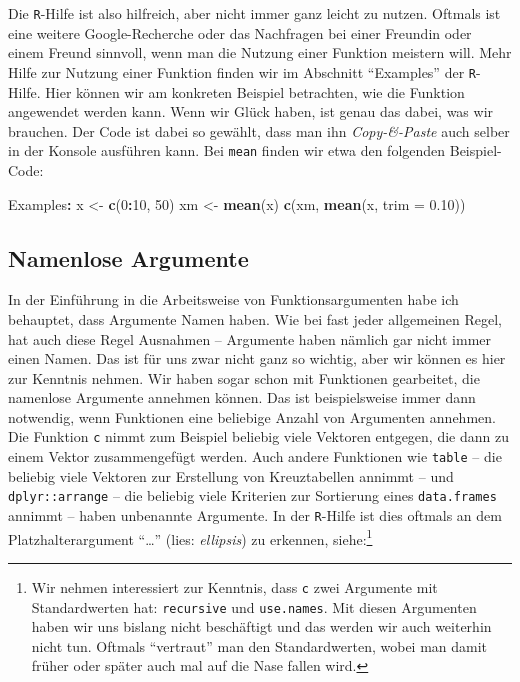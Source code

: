 \documentclass[12pt,]{tufte-book}
\newenvironment{Shaded}{\begin{snugshade}}{\end{snugshade}}
\newcommand{\KeywordTok}[1]{\textcolor[rgb]{0.13,0.29,0.53}{\textbf{#1}}}
\newcommand{\DataTypeTok}[1]{\textcolor[rgb]{0.13,0.29,0.53}{#1}}
\newcommand{\DecValTok}[1]{\textcolor[rgb]{0.00,0.00,0.81}{#1}}
\newcommand{\FloatTok}[1]{\textcolor[rgb]{0.00,0.00,0.81}{#1}}
\newcommand{\StringTok}[1]{\textcolor[rgb]{0.31,0.60,0.02}{#1}}
\newcommand{\OperatorTok}[1]{\textcolor[rgb]{0.81,0.36,0.00}{\textbf{#1}}}
\newcommand{\NormalTok}[1]{#1}
\theoremstyle{definition}
\theoremstyle{definition}
\theoremstyle{definition}
\theoremstyle{remark}
\begin{document}
Die \texttt{R}-Hilfe ist also hilfreich, aber nicht immer ganz leicht zu
nutzen. Oftmals ist eine weitere Google-Recherche oder das Nachfragen
bei einer Freundin oder einem Freund sinnvoll, wenn man die Nutzung
einer Funktion meistern will. Mehr Hilfe zur Nutzung einer Funktion
finden wir im Abschnitt ``Examples'' der \texttt{R}-Hilfe. Hier können
wir am konkreten Beispiel betrachten, wie die Funktion angewendet werden
kann. Wenn wir Glück haben, ist genau das dabei, was wir brauchen. Der
Code ist dabei so gewählt, dass man ihn \emph{Copy-\&-Paste} auch selber
in der Konsole ausführen kann. Bei \texttt{mean} finden wir etwa den
folgenden Beispiel-Code:

\begin{Shaded}
\begin{Highlighting}[]
\NormalTok{Examples}\OperatorTok{:}
\StringTok{     }\NormalTok{x <-}\StringTok{ }\KeywordTok{c}\NormalTok{(}\DecValTok{0}\OperatorTok{:}\DecValTok{10}\NormalTok{, }\DecValTok{50}\NormalTok{)}
\NormalTok{     xm <-}\StringTok{ }\KeywordTok{mean}\NormalTok{(x)}
     \KeywordTok{c}\NormalTok{(xm, }\KeywordTok{mean}\NormalTok{(x, }\DataTypeTok{trim =} \FloatTok{0.10}\NormalTok{))}
\end{Highlighting}
\end{Shaded}

\subsection{Namenlose Argumente}\label{namenlose-argumente}

In der Einführung in die Arbeitsweise von Funktionsargumenten habe ich
behauptet, dass Argumente Namen haben. Wie bei fast jeder allgemeinen
Regel, hat auch diese Regel Ausnahmen -- Argumente haben nämlich gar
nicht immer einen Namen. Das ist für uns zwar nicht ganz so wichtig,
aber wir können es hier zur Kenntnis nehmen. Wir haben sogar schon mit
Funktionen gearbeitet, die namenlose Argumente annehmen können. Das ist
beispielsweise immer dann notwendig, wenn Funktionen eine beliebige
Anzahl von Argumenten annehmen. Die Funktion \texttt{c} nimmt zum
Beispiel beliebig viele Vektoren entgegen, die dann zu einem Vektor
zusammengefügt werden. Auch andere Funktionen wie \texttt{table} -- die
beliebig viele Vektoren zur Erstellung von Kreuztabellen annimmt -- und
\texttt{dplyr::arrange} -- die beliebig viele Kriterien zur Sortierung
eines \texttt{data.frames} annimmt -- haben unbenannte Argumente. In der
\texttt{R}-Hilfe ist dies oftmals an dem Platzhalterargument
``\ldots{}'' (lies: \emph{ellipsis}) zu erkennen, siehe:\footnote{Wir
  nehmen interessiert zur Kenntnis, dass \texttt{c} zwei Argumente mit
  Standardwerten hat: \texttt{recursive} und \texttt{use.names}. Mit
  diesen Argumenten haben wir uns bislang nicht beschäftigt und das
  werden wir auch weiterhin nicht tun. Oftmals ``vertraut'' man den
  Standardwerten, wobei man damit früher oder später auch mal auf die
  Nase fallen wird.}
\end{document}
